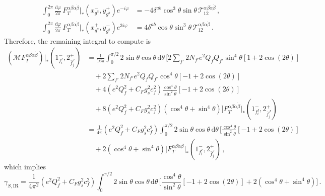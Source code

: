 \begin{subappendices}
\begin{align}
    \int_0^{2\pi}\frac{\text{d}\varphi}{2\pi}\,F_T^{\alpha\beta\dot\alpha\dot\beta}|_{*}(x_{g^a}^{-},y_{g^b}^{+})e^{-i\varphi} &= -4\delta^{ab}\cos^3\theta\sin\theta\, \mathcal T^{\alpha\beta\dot\alpha\dot\beta}_{12}\,, \\
    \int_0^{2\pi}\frac{\text{d}\varphi}{2\pi}\,F_T^{\alpha\beta\dot\alpha\dot\beta}|_{*}(x_{g^a}^{+},y_{g^b}^{-})e^{3i\varphi} &= 4\delta^{ab}\cos\theta\sin^3\theta\, \mathcal T^{\alpha\beta\dot\alpha\dot\beta}_{12}\,.
\end{align}
Therefore, the remaining integral to compute is
\begin{align}
    (\mathcal M F_T^{\alpha\beta\dot\alpha\dot\beta})|_{*}(1^-_{f_i^I},2^+_{\bar f_j^J}) &= \frac{1}{16\pi}\int_0^{\pi/2}2\sin\theta\cos\theta \,\text{d}\theta\,\bigg[2\sum_{f'}2 N_{f'}e^2Q_f Q_{f'}\sin^4\theta [1+2\cos(2\theta)]\nonumber \\
    &\quad +2\sum_{f'}2 N_{f'}e^2Q_f Q_{f'}\cos^4\theta[-1+2\cos(2\theta)]\nonumber \\
    &\quad +4(e^2Q_f^2+C_Fg_s^2c_f^2)\frac{\cos^4\theta}{\sin^2\theta}[-1+2\cos(2\theta)]\nonumber \\
    &\quad  +8(e^2Q_f^2+C_Fg_s^2c_f^2)(\cos^4\theta + \sin^4\theta)
    \bigg]F_T^{\alpha\beta\dot\alpha\dot\beta}|_{*}(1^-_{f_i^I},2^+_{\bar f_j^J})\nonumber \\
    &= \frac{1}{4\pi}(e^2Q_f^2+C_Fg_s^2c_f^2)\int_0^{\pi/2}2\sin\theta\cos\theta \,\text{d}\theta\,\bigg[\frac{\cos^4\theta}{\sin^2\theta}[-1+2\cos(2\theta)]\nonumber\\
    &\quad +2(\cos^4\theta + \sin^4\theta) \bigg]
    F_T^{\alpha\beta\dot\alpha\dot\beta}|_{*}(1^-_{f_i^I},2^+_{\bar f_j^J})\,,
\end{align}
which implies
\begin{equation}\label{eq:ALPgammaS_IR_angular}
    \gamma_{S,\text{IR}} = \frac{1}{4\pi^2}(e^2Q_f^2+C_Fg_s^2c_f^2)\int_0^{\pi/2}2\sin\theta\cos\theta \,\text{d}\theta\,\bigg[\frac{\cos^4\theta}{\sin^2\theta}[-1+2\cos(2\theta)]+2(\cos^4\theta + \sin^4\theta) \bigg]\,.
\end{equation}


\end{subappendices}
